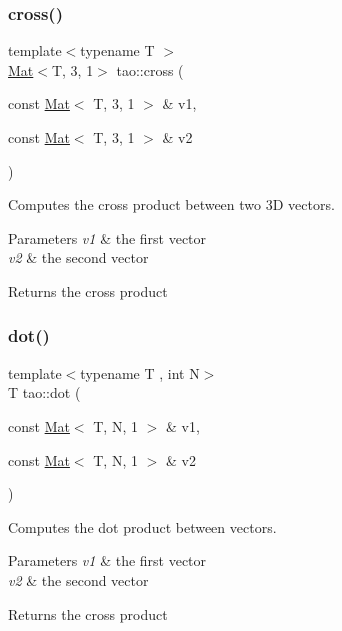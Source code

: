 \subsubsection{\texorpdfstring{cross()}{cross()}}
{\footnotesize\ttfamily template$<$typename T $>$ \\
\mbox{\hyperlink{classtao_1_1_mat}{Mat}}$<$T, 3, 1$>$ tao\+::cross (\begin{DoxyParamCaption}\item[{const \mbox{\hyperlink{classtao_1_1_mat}{Mat}}$<$ T, 3, 1 $>$ \&}]{v1,  }\item[{const \mbox{\hyperlink{classtao_1_1_mat}{Mat}}$<$ T, 3, 1 $>$ \&}]{v2 }\end{DoxyParamCaption})}



Computes the cross product between two 3D vectors. 


\begin{DoxyParams}{Parameters}
{\em v1} & the first vector \\
\hline
{\em v2} & the second vector \\
\hline
\end{DoxyParams}
\begin{DoxyReturn}{Returns}
the cross product 
\end{DoxyReturn}
\mbox{\label{namespacetao_a01d099eba731722c912f651d0956dc42}} 
\subsubsection{\texorpdfstring{dot()}{dot()}}
{\footnotesize\ttfamily template$<$typename T , int N$>$ \\
T tao\+::dot (\begin{DoxyParamCaption}\item[{const \mbox{\hyperlink{classtao_1_1_mat}{Mat}}$<$ T, N, 1 $>$ \&}]{v1,  }\item[{const \mbox{\hyperlink{classtao_1_1_mat}{Mat}}$<$ T, N, 1 $>$ \&}]{v2 }\end{DoxyParamCaption})}



Computes the dot product between vectors. 


\begin{DoxyParams}{Parameters}
{\em v1} & the first vector \\
\hline
{\em v2} & the second vector \\
\hline
\end{DoxyParams}
\begin{DoxyReturn}{Returns}
the cross product 
\end{DoxyReturn}
\mbox{\label{namespacetao_ab38f346af660c21af2f77045cd9d1dad}} 
